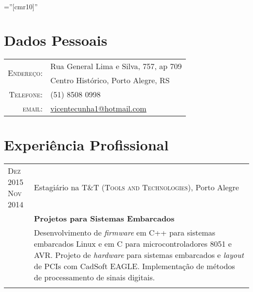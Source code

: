 \documentclass[a4paper,10pt]{article} %
\begin{document}
\pagestyle{empty} %

\font\fb=''[cmr10]'' %


\par{\bigskip\par} %

\section{Dados Pessoais}

\begin{tabular}{rl}
\multirow{2}{*}{\textsc{Endereço:}} & Rua General Lima e Silva, 757, ap 709 \\ &Centro Histórico, Porto Alegre, RS \\
\textsc{Telefone:} & (51) 8508 0998\\
\textsc{email:} & \href{mailto:vicentecunha1@hotmail.com}{vicentecunha1@hotmail.com}
\end{tabular}


\section{Experiência Profissional}

\begin{tabular}{p{1.5cm}|p{12cm}}

\pbox{20cm}{\textsc{Dez} 2015 \\ \textsc{Nov} 2014} & Estagiário na \textsc{T\&T (Tools and Technologies)}, Porto Alegre \\
& \textbf{Projetos para Sistemas Embarcados}\\ 
& \footnotesize{Desenvolvimento de \textit{firmware} em C++ para sistemas embarcados Linux e em C para microcontroladores 8051 e AVR. Projeto de \textit{hardware} para sistemas embarcados e \textit{layout} de PCIs com CadSoft EAGLE. Implementação de métodos de processamento de sinais digitais.}\\
\multicolumn{2}{c}{} \\

\end{tabular}
\end{document}
